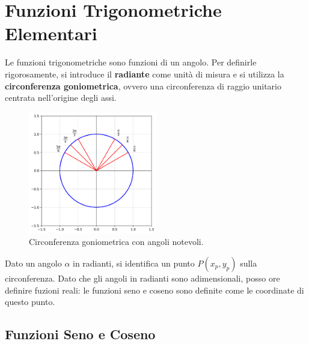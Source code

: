 \documentclass[oneside,10pt]{book} %
\begin{document}
  \section{Funzioni Trigonometriche Elementari}
Le funzioni trigonometriche sono funzioni di un angolo. Per definirle rigorosamente, si introduce il \textbf{radiante} come unità di misura e si utilizza la \textbf{circonferenza goniometrica}, ovvero una circonferenza di raggio unitario centrata nell'origine degli assi.

\begin{figure}[H]
    \centering
    \includegraphics[width=0.5\textwidth]{./img/circonferenza_goniometrica.png}
    \caption{Circonferenza goniometrica con angoli notevoli.}
    \label{fig:circonferenza_goniometrica}
\end{figure}
\FloatBarrier

Dato un angolo \(\alpha\) in radianti, si identifica un punto \(P(x_p, y_p)\) sulla circonferenza. Dato che gli angoli in radianti sono adimensionali, posso ore definire fuzioni reali: le funzioni seno e coseno sono definite come le coordinate di questo punto.


\subsection{Funzioni Seno e Coseno}
\end{document}
